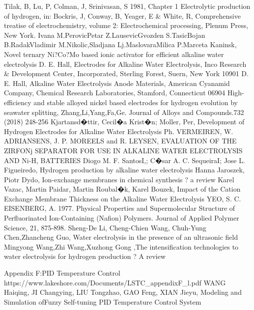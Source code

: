 \begin{thebibliography}{99}
Tilak, B, Lu, P, Colman, J,  Srinivasan, S 1981, Chapter 1  Electrolytic production of hydrogen, in: Bockris, J, Conway, B, Yeager, E \& White, R, Comprehensive treatise of electrochemistry, volume 2: Electrochemical processing, Plenum Press, New York.
Ivana M.PerovicPetar Z.LausevicGvozden S.TasicBojan B.RadakVladimir M.Nikolic,Sladjana Lj.MaslovaraMilica P.Marceta Kaninsk, Novel ternary Ni?Co?Mo based ionic activator for efficient alkaline water electrolysis
D. E. Hall, Electrodes for Alkaline Water Electrolysis, Inco Research \& Development Center, Incorporated, Sterling Forest, Suern, New York 10901
D. E. Hall, Alkaline Water Electrolysis Anode Materials, American Cyanamid Company, Chemical Research Laboratories, Stamford, Connecticut 06904
High-efficiency and stable alloyed nickel based electrodes for hydrogen evolution by seawater splitting, Zhang,Li,Yang,Fa,Ge. Journal of Alloys and Compounds.732 (2018) 248-256
Kjartansd�ttir, Cecil�a Krist�n; Moller, Per, Development of Hydrogen Electrodes for Alkaline Water Electrolysis
Ph. VERMEIREN, W. ADRIANSENS, J. P. MOREELS and R. LEYSEN,  EVALUATION OF THE ZIRFONj SEPARATOR FOR USE IN ALKALINE WATER ELECTROLYSIS AND Ni-H, BATTERIES
Diogo M. F. SantosI,; C�sar A. C. SequeiraI; Jose L. Figueiredo, Hydrogen production by alkaline water electrolysis
Hanna Jaroszek, Piotr Dydo, Ion-exchange membranes in chemical synthesis ? a review
Karel Vazac, Martin Paidar, Martin Roubal�k, Karel Bouzek, Impact of the Cation Exchange Membrane Thickness on the Alkaline Water Electrolysis
YEO, S. C.  EISENBERG, A. 1977. Physical Properties and Supermolecular Structure of Perfluorinated
Ion-Containing (Nafion) Polymers. Journal of Applied Polymer Science, 21, 875-898.
Sheng-De Li, Cheng-Chien Wang, Chuh-Yung Chen,Zhancheng Guo, Water electrolysis in the presence of an ultrasonic field
Mingyong Wang,Zhi Wang,Xuzhong Gong ,The intensification technologies to water electrolysis for hydrogen production ? A review

Appendix F:PID Temperature Control https://www.lakeshore.com/Documents/LSTC\_appendixF\_l.pdf
WANG Haiqing, JI Changying, LIU Tongzhao, GAO Feng, XIAN Jieyu, Modeling and Simulation ofFuzzy Self-tuning PID Temperature Control System





\end{thebibliography}
